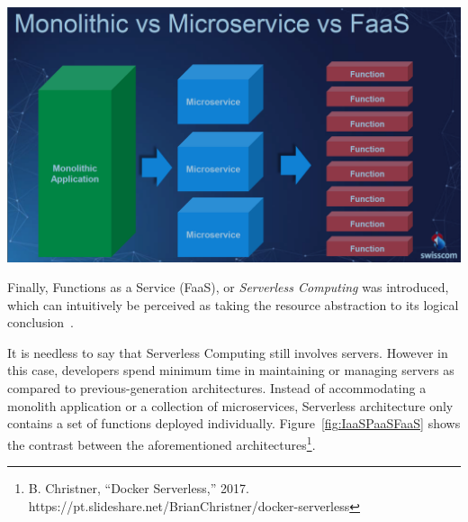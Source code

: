 	\begin{framed}
		\centering
		\includegraphics[width=\textwidth]{images/monoVSmicroVSfaas.png}
		\label{fig:IaaSPaaSFaaS}
	\end{framed}


Finally, Functions as a Service (FaaS), or \textit{Serverless Computing} was introduced, which can intuitively be perceived as taking the resource abstraction to its logical \mbox{conclusion \footnotemark}. \addtocounter{footnote}{0}  It is needless to say that Serverless Computing still involves servers. However in this case, developers spend minimum time in maintaining or managing servers as compared to previous-generation architectures. Instead of accommodating a monolith application or a collection of microservices, Serverless architecture only contains a set of functions deployed individually. Figure~\ref{fig:IaaSPaaSFaaS} shows the contrast between the aforementioned architectures\footnote{B. Christner, “Docker Serverless,” 2017. https://pt.slideshare.net/BrianChristner/docker-serverless}.

